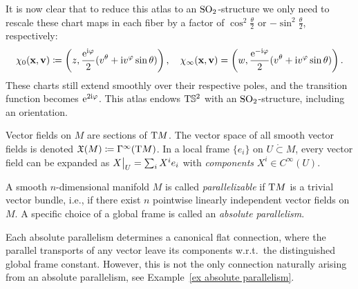 \begin{example}
    It is now clear that to reduce this atlas to an $\operatorname{SO}_2$-structure we only need to rescale these chart maps in each fiber by a factor of $\cos^2\frac{\theta}{2}$ or $-\sin^2\frac{\theta}{2}$, respectively:
    \[\chi_0(\mathbf{x},\mathbf{v})\coloneqq \left(z,\frac{\mathrm{e}^{\mathrm{i}\varphi}}{2}(v^\theta+\mathrm{i} v^\varphi\sin\theta) \right),\quad \chi_\infty(\mathbf{x},\mathbf{v})=\left(w,\frac{\mathrm{e}^{-\mathrm{i}\varphi}}{2}(v^\theta+\mathrm{i} v^\varphi\sin\theta )\right).\] 
    These charts still extend smoothly over their respective poles, and the transition function becomes $\mathrm{e}^{2\mathrm{i}\varphi}$. This atlas endows $\mathrm{T}\mathbb{S}^2$ with an $\operatorname{SO}_2$-structure, including an orientation.
\end{example}


\begin{defn}
    Vector fields on $M$ are sections of $\mathrm{T} M$. The vector space of all smooth vector fields is denoted $\mathfrak{X}(M)\coloneqq \Gamma^\infty(\mathrm{T} M)$. In a local frame $\{e_i\}$ on $U\mathring{\subset}M$, every vector field can be expanded as $\restr{X}{U}=\sum_i X^i e_i$ with \emph{components} $X^i\in C^\infty(U)$.
\end{defn}

\begin{defn}[Parallelism]\label{def parallelizable}
    A smooth $n$-dimensional manifold $M$ is called \emph{parallelizable} if $\mathrm{T} M$ is a trivial vector bundle, i.e., if there exist $n$ pointwise linearly independent vector fields on $M$. A specific choice of a global frame is called an \emph{absolute parallelism}.
\end{defn}

\begin{rem}
     Each absolute parallelism determines a canonical flat connection, where the parallel transports of any vector leave its components w.r.t.\ the distinguished global frame constant. However, this is not the only connection naturally arising from an absolute parallelism, see Example~\ref{ex absolute parallelism}.
\end{rem}

